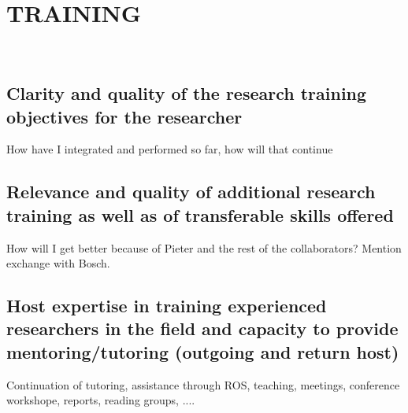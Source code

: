 \section{TRAINING} %
\label{sec:training}
\\
\subsection{Clarity and quality of the research training objectives for the researcher}
How have I integrated and performed so far, how will that continue
\subsection{Relevance and quality of additional research training as well as of transferable skills offered}
How will I get better because of Pieter and the rest of the collaborators?
Mention exchange with Bosch.
\subsection{Host expertise in training  experienced researchers in the field and capacity to provide 
mentoring/tutoring (outgoing and return host)} 
Continuation of tutoring, assistance through ROS, teaching, meetings, conference workshope, reports, reading groups, 
....
\newpage


